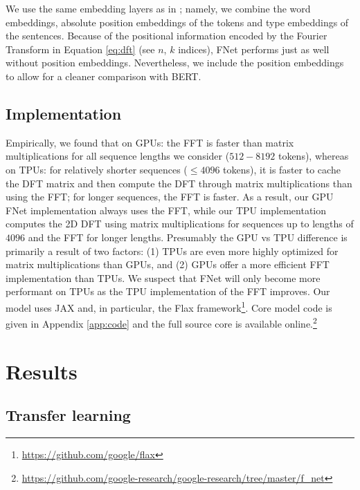 \documentclass[11pt]{article}
\begin{document}
We use the same embedding layers as in \citet{devlin2018bert}; namely, we combine the word embeddings, absolute position embeddings of the tokens and type embeddings of the sentences. Because of the positional information encoded by the Fourier Transform in Equation \eqref{eq:dft} (see $n$, $k$ indices), FNet performs just as well without position embeddings. Nevertheless, we include the position embeddings to allow for a cleaner comparison with BERT.


\subsection{Implementation}
\label{subsec:implementation}

Empirically, we found that on GPUs: the FFT is faster than matrix multiplications for all sequence lengths we consider ($512 - 8192$ tokens), whereas on TPUs: for relatively shorter sequences ($\leq 4096$ tokens), it is faster to cache the DFT matrix and then compute the DFT through matrix multiplications than using the FFT; for longer sequences, the FFT is faster. As a result, our GPU FNet implementation always uses the FFT, while our TPU implementation computes the 2D DFT using matrix multiplications for sequences up to lengths of $4096$ and the FFT for longer lengths.
Presumably the GPU vs TPU difference is primarily a result of two factors: (1) TPUs are even more highly optimized for matrix multiplications than GPUs, and (2) GPUs offer a more efficient FFT implementation than TPUs. We suspect that FNet will only become more performant on TPUs as the TPU implementation of the FFT improves. Our model uses JAX and, in particular, the Flax framework\footnote{\url{https://github.com/google/flax}}. Core model code is given in Appendix \ref{app:code} and the full source core is available online.\footnote{\url{https://github.com/google-research/google-research/tree/master/f_net}} \section{Results}
\label{sec:results}


\subsection{Transfer learning}
\label{subsec:transfer_learning}
\end{document}
